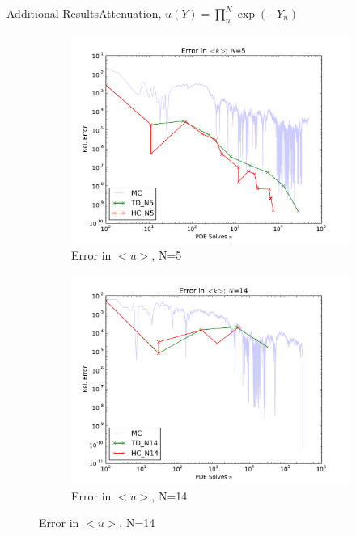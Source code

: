 \documentclass{beamer}
\begin{document}
\begin{frame}{Additional Results}{Attenuation,  $u(Y)=\prod_n^N \exp(-Y_n)$}
  \begin{figure}[h!]
    \centering
    \begin{subfigure}[b]{0.49 \textwidth}
      \includegraphics[width=\textwidth]{../graphics/err_5}
      \caption{Error in $<u>$, N=5}
      \label{err_5}
    \end{subfigure}
    \begin{subfigure}[b]{0.49 \textwidth}
      \includegraphics[width=\textwidth]{../graphics/err_14}
      \caption{Error in $<u>$, N=14}
      \label{err_14}
    \end{subfigure}
  \end{figure}
\end{frame}
\end{document}

